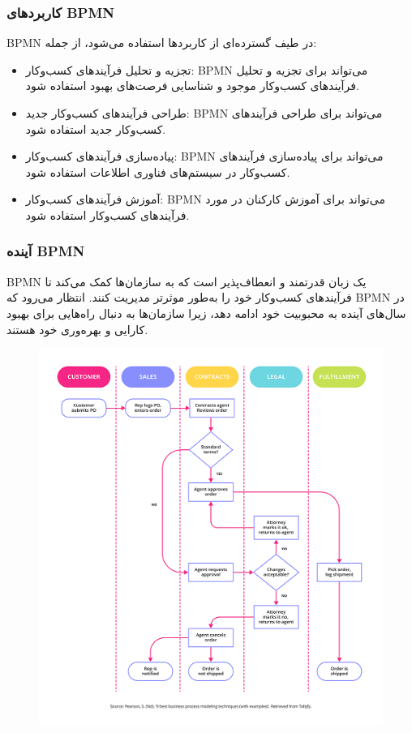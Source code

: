 \subsubsection*{کاربردهای BPMN}

BPMN در طیف گسترده‌ای از کاربردها استفاده می‌شود، از جمله:

\begin{itemize}
	\item تجزیه و تحلیل فرآیندهای کسب‌وکار: BPMN می‌تواند برای تجزیه و تحلیل فرآیندهای کسب‌وکار موجود و شناسایی فرصت‌های بهبود استفاده شود.
	\item طراحی فرآیندهای کسب‌وکار جدید: BPMN می‌تواند برای طراحی فرآیندهای کسب‌وکار جدید استفاده شود.
	\item پیاده‌سازی فرآیندهای کسب‌وکار: BPMN می‌تواند برای پیاده‌سازی فرآیندهای کسب‌وکار در سیستم‌های فناوری اطلاعات استفاده شود.
	\item آموزش فرآیندهای کسب‌وکار: BPMN می‌تواند برای آموزش کارکنان در مورد فرآیندهای کسب‌وکار استفاده شود.
\end{itemize}

\subsubsection*{آینده BPMN}

BPMN یک زبان قدرتمند و انعطاف‌پذیر است که به سازمان‌ها کمک می‌کند تا فرآیندهای کسب‌وکار خود را به‌طور موثرتر مدیریت کنند. انتظار می‌رود که BPMN در سال‌های آینده به محبوبیت خود ادامه دهد، زیرا سازمان‌ها به دنبال راه‌هایی برای بهبود کارایی و بهره‌وری خود هستند.


\begin{figure}[H]
	\centering
	\includegraphics{pic5.png}
	\label{fig:label4}
\end{figure}

